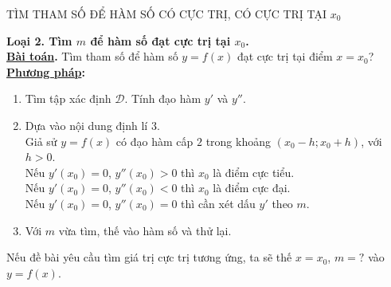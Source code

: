 \begin{dang}{TÌM THAM SỐ ĐỂ HÀM SỐ CÓ CỰC TRỊ, CÓ CỰC TRỊ TẠI $x_0$}


\textbf{Loại 2. Tìm $m$ để hàm số đạt cực trị tại $x_0$.} \\
\textbf{\underline{Bài toán}.} Tìm tham số để hàm số $y=f(x)$ đạt cực trị tại điểm $x=x_0$?\\
\textbf{\underline{Phương pháp}:}
\begin{enumerate}[\bf Bước 1.]
\item Tìm tập xác định $\mathscr{D}$. Tính đạo hàm $y'$ và $y''$.
\item Dựa vào nội dung định lí 3. \\
Giả sử $y=f(x)$ có đạo hàm cấp $2$ trong khoảng $\left(x_0-h;x_0+h\right)$, với $h>0$.\\
Nếu $y'\left(x_0\right)=0$, $y''\left(x_0\right)>0$ thì $x_0$ là điểm cực tiểu.\\
Nếu $y'\left(x_0\right)=0$, $y''\left(x_0\right)<0$ thì $x_0$ là điểm cực đại.\\
Nếu $y'(x_0)=0$, $y''(x_0)=0$ thì cần xét dấu $y'$ theo $m$.
\item Với $m$ vừa tìm, thế vào hàm số và thử lại.
\end{enumerate}
\begin{note}
Nếu đề bài yêu cầu tìm giá trị cực trị tương ứng, ta sẽ thế $x=x_0$, $m=?$ vào $y=f(x)$.
\end{note}
\end{dang}
